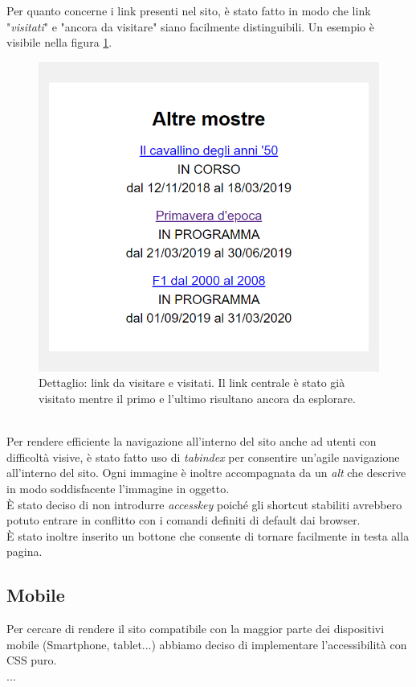 Per quanto concerne i link presenti nel sito, è stato fatto in modo che link "\textit{visitati}" e "ancora da visitare" siano facilmente distinguibili. Un esempio è visibile nella figura \ref{fig:linkVisitatiDaVisitare}.
\begin{figure}[h]
	\begin{center}
		\includegraphics[scale=1.5]{Images/linkVisitatiDaVisitare.png}
		\caption{Dettaglio: link da visitare e visitati. Il link centrale è stato già visitato mentre il primo e l'ultimo risultano ancora da esplorare.}
		\label{fig:linkVisitatiDaVisitare}
	\end{center}
\end{figure}\\
Per rendere efficiente la navigazione all'interno del sito anche ad utenti con difficoltà visive, è stato fatto uso di \textit{tabindex} per consentire un'agile navigazione all'interno del sito. Ogni immagine è inoltre accompagnata da un \textit{alt} che descrive in modo soddisfacente l'immagine in oggetto.\\
È stato deciso di non introdurre \textit{accesskey} poiché gli shortcut stabiliti avrebbero potuto entrare in conflitto con i comandi definiti di default dai browser.\\
È stato inoltre inserito un bottone che consente di tornare facilmente in testa alla pagina.

\subsection{Mobile}
Per cercare di rendere il sito compatibile con la maggior parte dei dispositivi mobile (Smartphone, tablet...)
abbiamo deciso di implementare l'accessibilità con CSS puro.\\ ...


